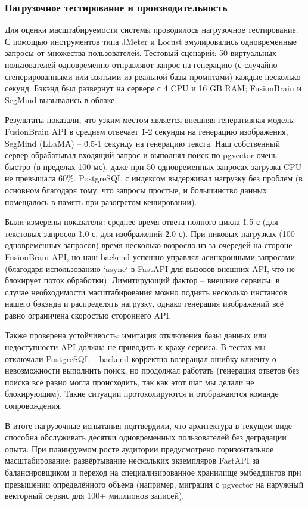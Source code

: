 \subsubsection{Нагрузочное тестирование и производительность}

Для оценки масштабируемости системы проводилось нагрузочное тестирование. С помощью инструментов типа JMeter и Locust эмулировались одновременные запросы от множества пользователей. Тестовый сценарий: 50 виртуальных пользователей одновременно отправляют запрос на генерацию (с случайно сгенерированными или взятыми из реальной базы промптами) каждые несколько секунд. Бэкэнд был развернут на сервере с 4 CPU и 16 GB RAM; FusionBrain и SegMind вызывались в облаке.

Результаты показали, что узким местом является внешняя генеративная модель: FusionBrain API в среднем отвечает \~1-2 секунды на генерацию изображения, SegMind (LLaMA) – \~0.5-1 секунду на генерацию текста. Наш собственный сервер обрабатывал входящий запрос и выполнял поиск по pgvector очень быстро (в пределах 100 мс), даже при 50 одновременных запросах загрузка CPU не превышала 60\%. PostgreSQL с индексом выдерживал нагрузку без проблем (в основном благодаря тому, что запросы простые, и большинство данных помещалось в память при разогретом кешировании).

Были измерены показатели: среднее время ответа полного цикла \~1.5 с (для текстовых запросов \~1.0 с, для изображений \~2.0 с). При пиковых нагрузках (100 одновременных запросов) время несколько возросло из-за очередей на стороне FusionBrain API, но наш backend успешно управлял асинхронными запросами (благодаря использованию `async` в FastAPI для вызовов внешних API, что не блокирует поток обработки). Лимитирующий фактор – внешние сервисы: в случае необходимости масштабирования можно поднять несколько инстансов нашего бэкэнда и распределять нагрузку, однако генерация изображений всё равно ограничена скоростью стороннего API.

Также проверена устойчивость: имитация отключения базы данных или недоступности API должна не приводить к краху сервиса. В тестах мы отключали PostgreSQL – backend корректно возвращал ошибку клиенту о невозможности выполнить поиск, но продолжал работать (генерация ответов без поиска все равно могла происходить, так как этот шаг мы делали не блокирующим). Такие ситуации протоколируются и отображаются команде сопровождения.

В итоге нагрузочные испытания подтвердили, что архитектура в текущем виде способна обслуживать десятки одновременных пользователей без деградации опыта. При планируемом росте аудитории предусмотрено горизонтальное масштабирование: развёртывание нескольких экземпляров FastAPI за балансировщиком и переход на специализированное хранилище эмбеддингов при превышении определённого объема (например, миграция с pgvector на наружный векторный сервис для 100+ миллионов записей).

